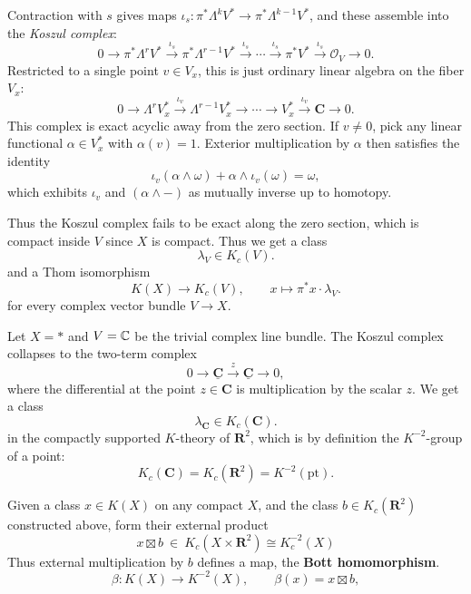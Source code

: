 \documentclass[12pt]{article}
\begin{document}
Contraction with $s$ gives maps
$\iota_s:\pi^*\Lambda^kV^*\to\pi^*\Lambda^{k-1}V^*$, and these assemble into the
\emph{Koszul complex}:
\[
0\longrightarrow \pi^*\Lambda^rV^* \xrightarrow{\iota_s} \pi^*\Lambda^{r-1}V^*
\xrightarrow{\iota_s} \cdots \xrightarrow{\iota_s} \pi^*V^* \xrightarrow{\iota_s}
\mathcal O_V \longrightarrow 0.
\]
Restricted to a single point $v\in V_x$, this is just ordinary linear algebra on the
fiber $V_x$:
\[
0\to \Lambda^rV_x^* \xrightarrow{\iota_v} \Lambda^{r-1}V_x^* \to \cdots \to
V_x^* \xrightarrow{\iota_v} \mathbf C \to 0.
\]
This complex is exact acyclic away from the zero section. If $v\neq 0$, pick any linear functional $\alpha\in V_x^*$ with $\alpha(v)=1$. Exterior multiplication by $\alpha$ then satisfies the identity
\[
\iota_v(\alpha\wedge\omega) + \alpha\wedge\iota_v(\omega) = \omega,
\]
which exhibits $\iota_v$ and $(\alpha\wedge -)$ as mutually inverse up to homotopy.

Thus the Koszul complex fails to be exact along the zero section, which is compact inside $V$ since $X$ is compact. Thus we get a class
\[
\lambda_V\in K_c(V).
\] and a Thom isomorphism
\[
K(X)\longrightarrow K_c(V), \qquad x\longmapsto \pi^*x\cdot\lambda_V.
\]for every complex
vector bundle $V\to X$. 
\begin{example} Let $X = *$ and $V = \mathbb{C}$ be the trivial complex line bundle. The Koszul complex collapses to the two-term complex
\[
0\longrightarrow \underline{\mathbf C} \xrightarrow{\ z\ } \underline{\mathbf C}
\longrightarrow 0,
\]
where the differential at the point $z\in\mathbf C$ is multiplication by the
scalar $z$. We get a class
\[
\lambda_{\mathbf C}\in K_c(\mathbf C).
\]
in the compactly supported $K$-theory of $\mathbf R^2$, which is
by definition the $K^{-2}$-group of a point:
\[
K_c(\mathbf C) = K_c(\mathbf R^2) = K^{-2}(\mathrm{pt}).
\]
\end{example}
Given a class $x\in K(X)$ on any compact $X$, and the class
$b\in K_c(\mathbf R^2)$ constructed above, form their external product
\[
x\boxtimes b \ \in\ K_c(X\times\mathbf R^2) \cong K^{-2}_c(X)
\]
Thus external multiplication by $b$ defines a map, the \textbf{Bott homomorphism}. 
\[
\beta: K(X)\longrightarrow K^{-2}(X), \qquad \beta(x) = x\boxtimes b,
\]
\end{document}
